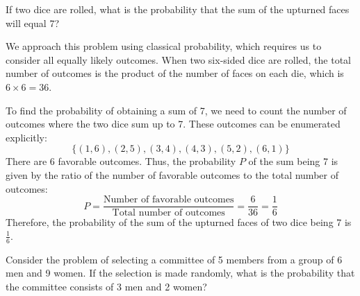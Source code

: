     \begin{example}
        If two dice are rolled, what is the probability that the sum of the upturned faces will equal 7?
        \end{example}
        
        \begin{solution}
        We approach this problem using classical probability, which requires us to consider all equally likely outcomes. When two six-sided dice are rolled, the total number of outcomes is the product of the number of faces on each die, which is $6 \times 6 = 36$.
        
        To find the probability of obtaining a sum of 7, we need to count the number of outcomes where the two dice sum up to 7. These outcomes can be enumerated explicitly:
        \[
        \{(1,6), (2,5), (3,4), (4,3), (5,2), (6,1)\}
        \]       
        There are 6 favorable outcomes. Thus, the probability $P$ of the sum being 7 is given by the ratio of the number of favorable outcomes to the total number of outcomes:
        \[
        P = \frac{\text{Number of favorable outcomes}}{\text{Total number of outcomes}} = \frac{6}{36} = \frac{1}{6}
        \]
        Therefore, the probability of the sum of the upturned faces of two dice being 7 is $\frac{1}{6}$.
        \end{solution}


    \begin{example}
        Consider the problem of selecting a committee of 5 members from a group of 6 men and 9 women. If the selection is made randomly, what is the probability that the committee consists of 3 men and 2 women?
    \end{example}
        
